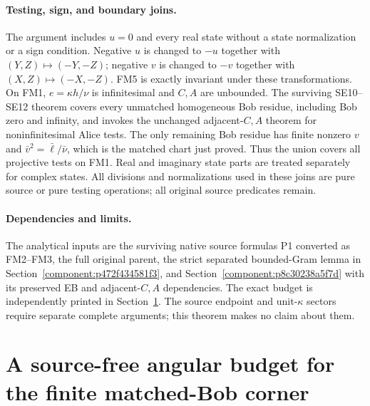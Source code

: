 \paragraph{Testing, sign, and boundary joins.}
The argument includes $u=0$ and every real state without a state
normalization or a sign condition. Negative $u$ is changed to
$-u$ together with $(Y,Z)\mapsto(-Y,-Z)$; negative $v$ is
changed to $-v$ together with $(X,Z)\mapsto(-X,-Z)$.
FM5 is exactly invariant under these transformations. On FM1,
$e=\kappa h/\nu$ is infinitesimal and $C,A$ are unbounded.
The surviving SE10--SE12 theorem covers every unmatched
homogeneous Bob residue, including Bob zero and infinity,
and invokes the unchanged adjacent-$C,A$ theorem for
noninfinitesimal Alice tests. The only remaining Bob residue
has finite nonzero $v$ and $\bar v^2=\bar\ell/\bar\nu$,
which is the matched chart just proved. Thus the union covers
all projective tests on FM1. Real and imaginary state parts
are treated separately for complex states. All divisions and
normalizations used in these joins are pure source or pure
testing operations; all original source predicates remain.

\paragraph{Dependencies and limits.}
The analytical inputs are the surviving native source formulas
P1 converted as FM2--FM3, the full original parent, the strict
separated bounded-Gram lemma in Section~\ref{component:p472f434581f3},
and Section~\ref{component:p8c30238a5f7d}
with its preserved EB and adjacent-$C,A$ dependencies.
The exact budget is independently printed in
Section~\ref{component:pe55ec4890781}. The source endpoint
and unit-$\kappa$ sectors require separate complete arguments;
this theorem makes no claim about them.


\section{\texorpdfstring{A source-free angular budget for the finite matched-Bob corner}{A source-free angular budget for the finite matched-Bob corner}}
\label{component:pe55ec4890781}

\label{pe55ec4890781:sec:new-c144-matched-budget}

